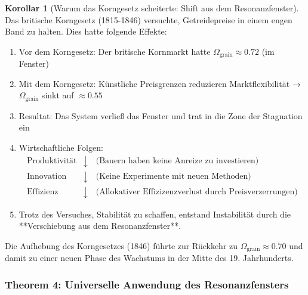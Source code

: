 \documentclass[a4paper,12pt,twoside]{report}
\theoremstyle{definition}
\newtheorem{korollar}{Korollar}
\begin{document}
\begin{korollar}[Warum das Korngesetz scheiterte: Shift aus dem Resonanzfenster]

Das britische Korngesetz (1815-1846) versuchte, Getreidepreise in einem engen Band zu halten. Dies hatte folgende Effekte:

\begin{enumerate}
	\item Vor dem Korngesetz: Der britische Kornmarkt hatte $\Omega_{\text{grain}} \approx 0.72$ (im Fenster)
	
	\item Mit dem Korngesetz: Künstliche Preisgrenzen reduzieren Marktflexibilität → $\Omega_{\text{grain}}$ sinkt auf $\approx 0.55$
	
	\item Resultat: Das System verließ das Fenster und trat in die Zone der Stagnation ein
	
	\item Wirtschaftliche Folgen:
	\begin{align}
	\text{Produktivität} &\downarrow \quad \text{(Bauern haben keine Anreize zu investieren)} \\
	\text{Innovation} &\downarrow \quad \text{(Keine Experimente mit neuen Methoden)} \\
	\text{Effizienz} &\downarrow \quad \text{(Allokativer Effizizenzverlust durch Preisverzerrungen)}
	\end{align}
	
	\item Trotz des Versuches, Stabilität zu schaffen, entstand Instabilität durch die **Verschiebung aus dem Resonanzfenster**.
\end{enumerate}

Die Aufhebung des Korngesetzes (1846) führte zur Rückkehr zu $\Omega_{\text{grain}} \approx 0.70$ und damit zu einer neuen Phase des Wachstums in der Mitte des 19. Jahrhunderts.

\end{korollar}

\subsubsection*{Theorem 4: Universelle Anwendung des Resonanzfensters}
\end{document}

